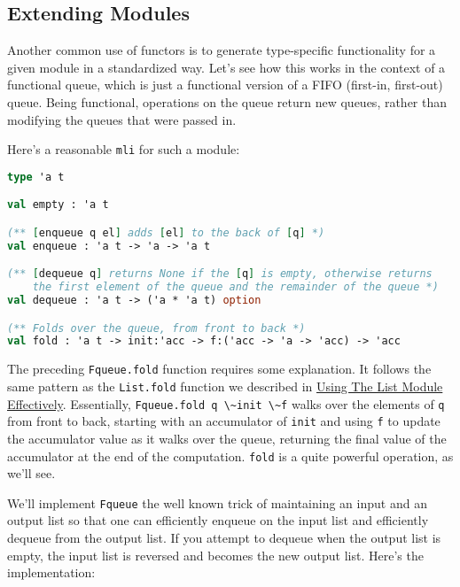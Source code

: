 \hypertarget{extending-modules}{%
\subsection{Extending Modules}\label{extending-modules}}

Another common use of functors is to generate type-specific
functionality for a given module in a standardized way. Let's see how
this works in the context of a functional queue, which is just a
functional version of a FIFO (first-in, first-out) queue. Being
functional, operations on the queue return new queues, rather than
modifying the queues that were passed
in.

Here's a reasonable \passthrough{\lstinline!mli!} for such a module:

\begin{lstlisting}[language=Caml]
type 'a t

val empty : 'a t

(** [enqueue q el] adds [el] to the back of [q] *)
val enqueue : 'a t -> 'a -> 'a t

(** [dequeue q] returns None if the [q] is empty, otherwise returns
    the first element of the queue and the remainder of the queue *)
val dequeue : 'a t -> ('a * 'a t) option

(** Folds over the queue, from front to back *)
val fold : 'a t -> init:'acc -> f:('acc -> 'a -> 'acc) -> 'acc
\end{lstlisting}

The preceding \passthrough{\lstinline!Fqueue.fold!} function requires
some explanation. It follows the same pattern as the
\passthrough{\lstinline!List.fold!} function we described in
\href{lists-and-patterns.html\#using-the-list-module-effectively}{Using
The List Module Effectively}. Essentially,
\passthrough{\lstinline!Fqueue.fold q \~init \~f!} walks over the
elements of \passthrough{\lstinline!q!} from front to back, starting
with an accumulator of \passthrough{\lstinline!init!} and using
\passthrough{\lstinline!f!} to update the accumulator value as it walks
over the queue, returning the final value of the accumulator at the end
of the computation. \passthrough{\lstinline!fold!} is a quite powerful
operation, as we'll see.

We'll implement \passthrough{\lstinline!Fqueue!} the well known trick of
maintaining an input and an output list so that one can efficiently
enqueue on the input list and efficiently dequeue from the output list.
If you attempt to dequeue when the output list is empty, the input list
is reversed and becomes the new output list. Here's the implementation:

